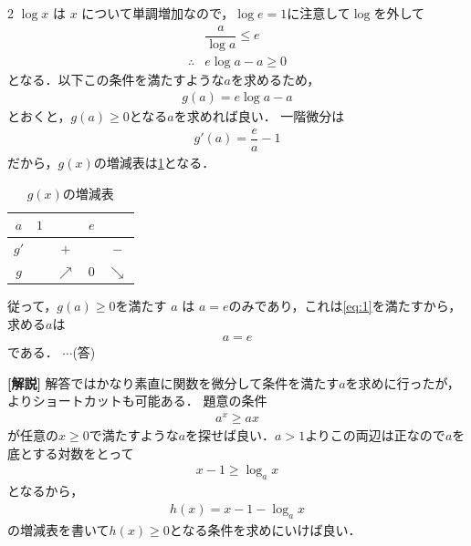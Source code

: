 \documentclass[../../main.tex]{subfiles}
\begin{document}
\begin{multicols}{2}
  $\log x$ は $x$ について単調増加なので，$\log e = 1$に注意して$\log$を外して
  \begin{align}
    & \dfrac{a}{\log a} \le  e \\
    \therefore
    & e\log a -a \ge 0
  \end{align}
  となる．以下この条件を満たすような$a$を求めるため，
  \begin{align}
    g(a) = e\log a -a
  \end{align}
  とおくと，$g(a)\ge 0$となる$a$を求めれば良い．
  一階微分は
  \begin{align}
    g'(a) = \dfrac{e}{a} -1
  \end{align}
  だから，$g(x)$の増減表は\cref{1993-4:table:2}となる．

  \begin{table}[H]
    \centering
    \caption{$g(x)$の増減表}
    \label{1993-4:table:2}
    \begin{tabular}{|c||c|c|c|c|}
      \hline
      $a$  & $1$ &            & $e$ &            \\
      \hline
      $g'$ &     & $+$        &     & $-$        \\
      \hline
      $g$  &     & $\nearrow$ & $0$ & $\searrow$ \\
      \hline
    \end{tabular}
  \end{table}
  従って，$g(a) \ge 0$を満たす $a$ は $a=e$のみであり，これは\cref{eq:1}を満たすから，
  求める$a$は
  \begin{align}
    a = e
  \end{align}
  である． $\cdots$(答)

  {\bf [解説]}
  解答ではかなり素直に関数を微分して条件を満たす$a$を求めに行ったが，よりショートカットも可能ある．
  題意の条件
  \begin{align}
    a^x \ge ax
  \end{align}
  が任意の$x\ge 0$で満たすような$a$を探せば良い．$a>1$よりこの両辺は正なので$a$を底とする対数をとって
  \begin{align}
    x-1 \ge \log_a x
  \end{align}
  となるから，
  \begin{align}
    h(x) = x-1 - \log_a x
  \end{align}
  の増減表を書いて$h(x)\ge 0$となる条件を求めにいけば良い．

  \newpage
\end{multicols}
\end{document}

